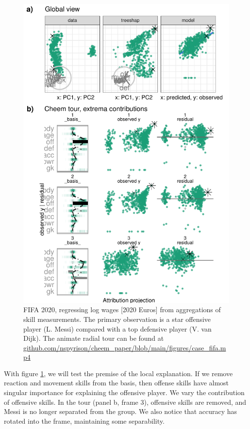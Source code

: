 \documentclass[
  article]{article}
\begin{document}
\begin{figure}

{\centering \includegraphics[width=1\linewidth]{./figures/case_fifa} 

}

\caption{FIFA 2020, regressing log wages {[}2020 Euros{]} from aggregations of skill measurements. The primary observation is a star offensive player (L. Messi) compared with a top defensive player (V. van Dijk). The animate radial tour can be found at \href{https://github.com/nspyrison/cheem_paper/blob/main/figures/case_fifa.mp4}{github.com/nspyrison/cheem\_paper/blob/main/figures/case\_fifa.mp4}}\label{fig:casefifa}
\end{figure}

With figure \ref{fig:casefifa}, we will test the premise of the local explanation. If we remove reaction and movement skills from the basis, then offense skills have almost singular importance for explaining the offensive player. We vary the contribution of offensive skills. In the tour (panel b, frame 3), offensive skills are removed, and Messi is no longer separated from the group. We also notice that accuracy has rotated into the frame, maintaining some separability.
\end{document}
